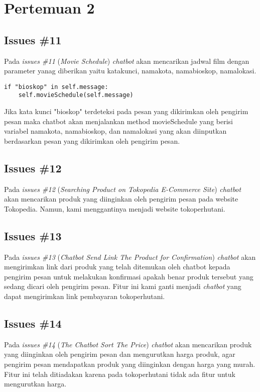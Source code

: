\chapter{Pertemuan 2}

\section{Issues \#11}
Pada \textit{issues \#11} (\textit{Movie Schedule}) \textit{chatbot} akan mencarikan jadwal film dengan parameter yanag diberikan yaitu katakunci, namakota, namabioskop, namalokasi.
\begin{verbatim}
if "bioskop" in self.message:
    self.movieSchedule(self.message)
\end{verbatim}
Jika kata kunci "bioskop" terdeteksi pada pesan yang dikirimkan oleh pengirim pesan maka chatbot akan menjalankan method movieSchedule yang berisi variabel namakota, namabioskop, dan namalokasi yang akan diinputkan berdasarkan pesan yang dikirimkan oleh pengirim pesan.

\section{Issues \#12}
Pada \textit{issues \#12} (\textit{Searching Product on Tokopedia E-Commerce Site}) \textit{chatbot} akan mencarikan produk yang diinginkan oleh pengirim pesan pada website Tokopedia. Namun, kami menggantinya menjadi website tokoperhutani. 

\section{Issues \#13}
Pada \textit{issues \#13} (\textit{Chatbot Send Link The Product for Confirmation}) \textit{chatbot} akan mengirimkan link dari produk yang telah ditemukan oleh chatbot kepada pengirim pesan untuk melakukan konfirmasi apakah benar produk tersebut yang sedang dicari oleh pengirim pesan. Fitur ini kami ganti menjadi \textit{chatbot} yang dapat mengirimkan link pembayaran tokoperhutani.

\section{Issues \#14}
Pada \textit{issues \#14} (\textit{The Chatbot Sort The Price}) \textit{chatbot} akan mencarikan produk yang diinginkan oleh pengirim pesan dan mengurutkan harga produk, agar pengirim pesan mendapatkan produk yang diinginkan dengan harga yang murah. Fitur ini telah ditiadakan karena pada tokoperhutani tidak ada fitur untuk mengurutkan harga.

